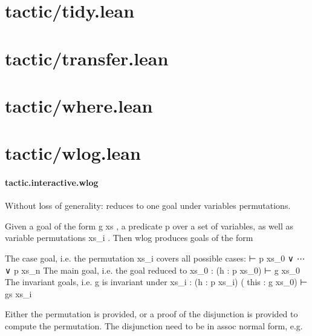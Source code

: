 \documentclass{article}
\begin{document}
\section{tactic/tidy.lean}\section{tactic/transfer.lean}\section{tactic/where.lean}\section{tactic/wlog.lean}\paragraph{tactic.interactive.wlog}
\par
Without loss of generality: reduces to one goal under variables permutations.
\par
Given a goal of the form 
\colorbox[RGB]{253,246,227}{{{{\color[RGB]{101, 123, 131} g xs }}}}, a predicate 
\colorbox[RGB]{253,246,227}{{{{\color[RGB]{101, 123, 131} p }}}} over a set of variables, as well as variable
permutations 
\colorbox[RGB]{253,246,227}{{{{\color[RGB]{101, 123, 131} xs\_i }}}}. Then 
\colorbox[RGB]{253,246,227}{{{{\color[RGB]{101, 123, 131} wlog }}}} produces goals of the form
\par
The case goal, i.e. the permutation 
\colorbox[RGB]{253,246,227}{{{{\color[RGB]{101, 123, 131} xs\_i }}}} covers all possible cases:
\colorbox[RGB]{253,246,227}{{{{\color[RGB]{101, 123, 131} ⊢ p xs\_0  }}}{{{\color[RGB]{181, 137, 0} ∨ }}}{{{\color[RGB]{101, 123, 131}  ⋯  }}}{{{\color[RGB]{181, 137, 0} ∨ }}}{{{\color[RGB]{101, 123, 131}  p xs\_n }}}}The main goal, i.e. the goal reduced to 
\colorbox[RGB]{253,246,227}{{{{\color[RGB]{101, 123, 131} xs\_0 }}}}:
\colorbox[RGB]{253,246,227}{{{{\color[RGB]{101, 123, 131} (h : p xs\_0) ⊢ g xs\_0 }}}}The invariant goals, i.e. 
\colorbox[RGB]{253,246,227}{{{{\color[RGB]{101, 123, 131} g }}}} is invariant under 
\colorbox[RGB]{253,246,227}{{{{\color[RGB]{101, 123, 131} xs\_i }}}}:
\colorbox[RGB]{253,246,227}{{{{\color[RGB]{101, 123, 131} (h : p xs\_i) ( }}}{{{\color[RGB]{133, 153, 0} this }}}{{{\color[RGB]{101, 123, 131}  : g xs\_0) ⊢ gs xs\_i }}}}\par
Either the permutation is provided, or a proof of the disjunction is provided to compute the
permutation. The disjunction need to be in assoc normal form, e.g. 
\end{document}
